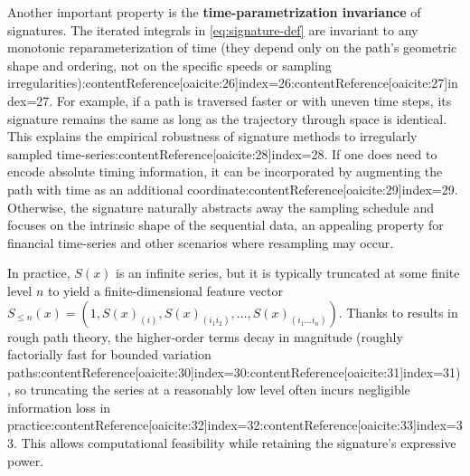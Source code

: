 \documentclass[11pt]{article}
\begin{document}
Another important property is the \textbf{time-parametrization invariance} of signatures. The iterated integrals in \eqref{eq:signature-def} are invariant to any monotonic reparameterization of time (they depend only on the path's geometric shape and ordering, not on the specific speeds or sampling irregularities):contentReference[oaicite:26]{index=26}:contentReference[oaicite:27]{index=27}. For example, if a path is traversed faster or with uneven time steps, its signature remains the same as long as the trajectory through space is identical. This explains the empirical robustness of signature methods to irregularly sampled time-series:contentReference[oaicite:28]{index=28}. If one does need to encode absolute timing information, it can be incorporated by augmenting the path with time as an additional coordinate:contentReference[oaicite:29]{index=29}. Otherwise, the signature naturally abstracts away the sampling schedule and focuses on the intrinsic shape of the sequential data, an appealing property for financial time-series and other scenarios where resampling may occur.

In practice, $S(x)$ is an infinite series, but it is typically truncated at some finite level $n$ to yield a finite-dimensional feature vector $S_{\le n}(x) = (1, S(x)_{(i)}, S(x)_{(i_1 i_2)}, \dots, S(x)_{(i_1\ldots i_n)})$. Thanks to results in rough path theory, the higher-order terms decay in magnitude (roughly factorially fast for bounded variation paths:contentReference[oaicite:30]{index=30}:contentReference[oaicite:31]{index=31}), so truncating the series at a reasonably low level often incurs negligible information loss in practice:contentReference[oaicite:32]{index=32}:contentReference[oaicite:33]{index=33}. This allows computational feasibility while retaining the signature’s expressive power.
\end{document}
